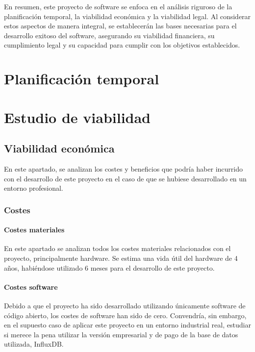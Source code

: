 En resumen, este proyecto de software se enfoca en el análisis riguroso de la planificación 
temporal, la viabilidad económica y la viabilidad legal. Al considerar estos aspectos de 
manera integral, se establecerán las bases necesarias para el desarrollo exitoso del software, 
asegurando su viabilidad financiera, su cumplimiento legal y su capacidad para cumplir con los 
objetivos establecidos.

\section{Planificación temporal}


\section{Estudio de viabilidad}

\subsection{Viabilidad económica}

En este apartado, se analizan los costes y beneficios que podría haber incurrido con el desarrollo 
de este proyecto en el caso de que se hubiese desarrollado en un entorno profesional.

\subsubsection{Costes}

\paragraph{Costes materiales}
En este apartado se analizan todos los costes materiales relacionados con el proyecto, principalmente 
hardware. Se estima una vida útil del hardware de 4 años, habiéndose utilizado 6 meses para 
el desarrollo de este proyecto.


\paragraph{Costes software}
Debido a que el proyecto ha sido desarrollado utilizando únicamente software de código abierto,
los costes de software han sido de cero. Convendría, sin embargo, en el supuesto caso de aplicar
este proyecto en un entorno industrial real, estudiar si merece la pena utilizar la versión empresarial 
y de pago de la base de datos utilizada, InfluxDB.

